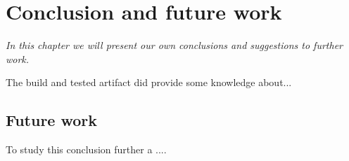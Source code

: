 \chapter{Conclusion and future work}

\emph{In this chapter we will present our own conclusions and suggestions to further work.}

The build and tested artifact did provide some knowledge about...

\section{Future work}

To study this conclusion further a ....